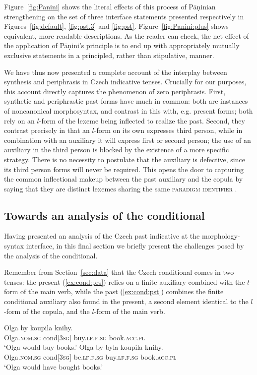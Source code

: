 \documentclass[output=paper]{langsci/langscibook}
\begin{document}
Figure~\ref{fig:Panini} shows the literal effects of this  process of Pāṇinian strengthening on the set of three interface statements presented respectively in Figures~\ref{fig:default}, \ref{fig:pst.3} and \ref{fig:pst}. Figure~\ref{fig:Panini:plus} shows equivalent, more readable descriptions.  As the reader can check, the net effect of the application of Pāṇini's principle is to end up with appropriately mutually exclusive statements in a principled, rather than stipulative, manner. 


We have thus now presented a complete account of the interplay between synthesis and periphrasis in Czech indicative tenses. Crucially for our purposes, this account directly captures  the phenomenon of zero periphrasis. First, synthetic and periphrastic past forms have much in common: both are instances of noncanonical morphosyntax, and contrast in this with, e.g. present forms;  both rely on an $l$-form of the lexeme being inflected to realize the past. Second, they contrast precisely in that an $l$-form on its own expresses third person, while in combination with an auxiliary it will express first or second person; the use of an auxiliary in the third person is blocked by the existence of a more specific strategy. There is no necessity to postulate that the auxiliary is defective, since its third person forms will never be required. This opens the door to capturing the common inflectional makeup between the past auxiliary and the copula by saying that they are distinct lexemes sharing the same \textsc{paradigm identifier} \citep{Bonami17b}.

\subsection{Towards an analysis of the conditional}
\label{sec:cond}

Having presented an analysis of the Czech past indicative at the morphology-syntax interface, in this final section we briefly present the challenges posed by the analysis of the conditional.

Remember from  Section~\ref{sec:data} that the Czech conditional comes in two tenses: the  present (\ref{ex:cond:prs}) relies on a finite auxiliary combined with the $l$-form of the main verb, while the  past  (\ref{ex:cond:pst}) combines the finite conditional auxiliary also found in the present, a second element identical to the $l$-form of the copula, and the $l$-form of the main verb.

\begin{exe}
\ex\label{ex:cond:both}\begin{xlist}
\ex\label{ex:cond:prs}\gll
Olga by koupila knihy.\\
Olga.\textsc{nom.sg} cond[\textsc{3sg}] buy.\textsc{lf.f.sg} book.\textsc{acc.pl}\\
\glt ‘Olga would buy books.'
\ex\label{ex:cond:pst}\gll
Olga by byla koupila knihy.\\
Olga.\textsc{nom.sg} cond[\textsc{3sg}] be.\textsc{lf.f.sg} buy.\textsc{lf.f.sg} book.\textsc{acc.pl}\\
\glt ‘Olga would have bought books.'
\end{xlist}
\end{exe}
\end{document}
